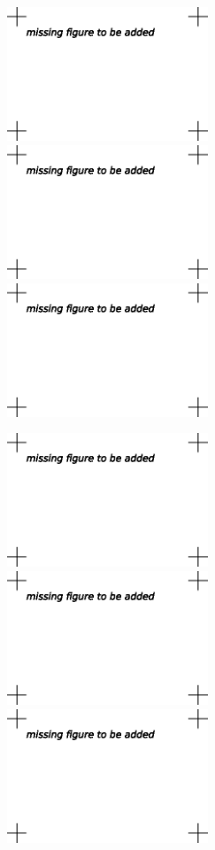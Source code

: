 \begin{figure}[bhpt]
\centerline{
\includegraphics[height=4cm]{chapters/hoffman-1/eps/naca_0012-vel1-aoa4-bw.eps}
\includegraphics[height=4cm]{chapters/hoffman-1/eps/naca_0012-vel1-aoa10-bw.eps}
\includegraphics[height=4cm]{chapters/hoffman-1/eps/naca_0012-vel1-aoa18-bw.eps}
}
\centerline{
\includegraphics[height=4cm]{chapters/hoffman-1/eps/naca_0012-aoa4-bw.eps}
\includegraphics[height=4cm]{chapters/hoffman-1/eps/naca_0012-aoa10-bw.eps}
\includegraphics[height=4cm]{chapters/hoffman-1/eps/naca_0012-aoa18-bw.eps}
}
\end{figure}

